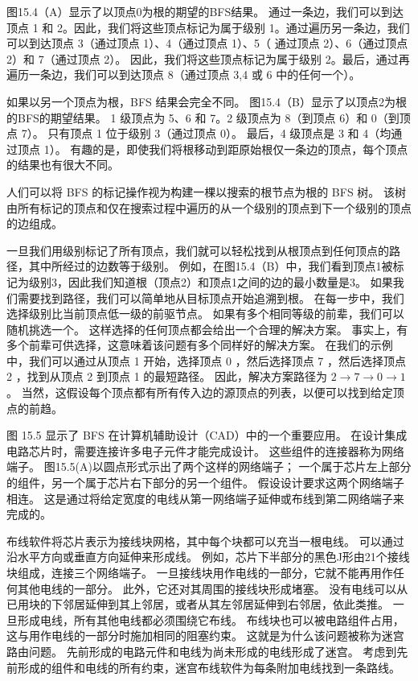 图15.4（A）显示了以顶点0为根的期望的BFS结果。 通过一条边，我们可以到达顶点 1 和 2。因此，我们将这些顶点标记为属于级别 1。通过遍历另一条边，我们可以到达顶点 3（通过顶点 1）、4（通过顶点 1）、5（ 通过顶点 2）、6（通过顶点 2）和 7（通过顶点 2）。 因此，我们将这些顶点标记为属于级别 2。最后，通过再遍历一条边，我们可以到达顶点 8（通过顶点 3,4 或 6 中的任何一个）。

如果以另一个顶点为根，BFS 结果会完全不同。 图15.4（B）显示了以顶点2为根的BFS的期望结果。 1 级顶点为 5、6 和 7。2 级顶点为 8（到顶点 6）和 0（到顶点 7）。 只有顶点 1 位于级别 3（通过顶点 0）。 最后，4 级顶点是 3 和 4（均通过顶点 1）。 有趣的是，即使我们将根移动到距原始根仅一条边的顶点，每个顶点的结果也有很大不同。

人们可以将 BFS 的标记操作视为构建一棵以搜索的根节点为根的 BFS 树。 该树由所有标记的顶点和仅在搜索过程中遍历的从一个级别的顶点到下一个级别的顶点的边组成。

一旦我们用级别标记了所有顶点，我们就可以轻松找到从根顶点到任何顶点的路径，其中所经过的边数等于级别。 例如，在图15.4（B）中，我们看到顶点1被标记为级别3，因此我们知道根（顶点2）和顶点1之间的边的最小数量是3。 如果我们需要找到路径，我们可以简单地从目标顶点开始追溯到根。 在每一步中，我们选择级别比当前顶点低一级的前驱节点。 如果有多个相同等级的前辈，我们可以随机挑选一个。 这样选择的任何顶点都会给出一个合理的解决方案。 事实上，有多个前辈可供选择，这意味着该问题有多个同样好的解决方案。 在我们的示例中，我们可以通过从顶点 1 开始，选择顶点 0 ，然后选择顶点 7 ，然后选择顶点 2 ，找到从顶点 2 到顶点 1 的最短路径。 因此，解决方案路径为 $2 \rightarrow 7 \rightarrow 0 \rightarrow 1$。 当然，这假设每个顶点都有所有传入边的源顶点的列表，以便可以找到给定顶点的前趋。

图 15.5 显示了 BFS 在计算机辅助设计（CAD）中的一个重要应用。 在设计集成电路芯片时，需要连接许多电子元件才能完成设计。 这些组件的连接器称为网络端子。 图15.5(A)以圆点形式示出了两个这样的网络端子； 一个属于芯片左上部分的组件，另一个属于芯片右下部分的另一个组件。 假设设计要求这两个网络端子相连。 这是通过将给定宽度的电线从第一网络端子延伸或布线到第二网络端子来完成的。

布线软件将芯片表示为接线块网格，其中每个块都可以充当一根电线。 可以通过沿水平方向或垂直方向延伸来形成线。 例如，芯片下半部分的黑色J形由21个接线块组成，连接三个网络端子。 一旦接线块用作电线的一部分，它就不能再用作任何其他电线的一部分。 此外，它还对其周围的接线块形成堵塞。 没有电线可以从已用块的下邻居延伸到其上邻居，或者从其左邻居延伸到右邻居，依此类推。 一旦形成电线，所有其他电线都必须围绕它布线。 布线块也可以被电路组件占用，这与用作电线的一部分时施加相同的阻塞约束。 这就是为什么该问题被称为迷宫路由问题。 先前形成的电路元件和电线为尚未形成的电线形成了迷宫。 考虑到先前形成的组件和电线的所有约束，迷宫布线软件为每条附加电线找到一条路线。

